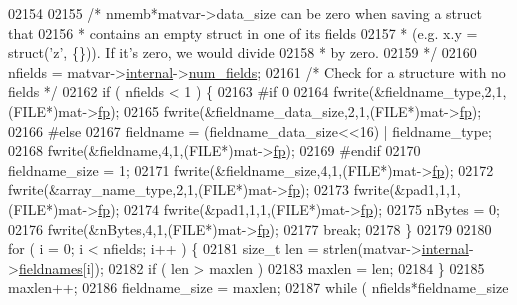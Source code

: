 \begin{DoxyCode}
{{{{{{{{{{{{{{{{02154 
02155             \textcolor{comment}{/* nmemb*matvar->data\_size can be zero when saving a struct that}
02156 \textcolor{comment}{             * contains an empty struct in one of its fields}
02157 \textcolor{comment}{             * (e.g. x.y = struct('z', \{\})). If it's zero, we would divide}
02158 \textcolor{comment}{             * by zero.}
02159 \textcolor{comment}{             */}
02160             nfields = matvar->\hyperlink{group___m_a_t_a6e97e3ed9f40c49322c18561c2a94e92}{internal}->\hyperlink{structmatvar__internal_a93fc447484f455eddf9334f2e9e411c2}{num\_fields};
02161             \textcolor{comment}{/* Check for a structure with no fields */}
02162             if ( nfields < 1 ) \{
02163 \textcolor{preprocessor}{#if 0}
02164                 fwrite(&fieldname\_type,2,1,(FILE*)mat->\hyperlink{struct__mat__t_a85f562e407ca9ad4d2a6e14f839432b7}{fp});
02165                 fwrite(&fieldname\_data\_size,2,1,(FILE*)mat->\hyperlink{struct__mat__t_a85f562e407ca9ad4d2a6e14f839432b7}{fp});
02166 \textcolor{preprocessor}{#else}
02167                 fieldname = (fieldname\_data\_size<<16) | fieldname\_type;
02168                 fwrite(&fieldname,4,1,(FILE*)mat->\hyperlink{struct__mat__t_a85f562e407ca9ad4d2a6e14f839432b7}{fp});
02169 \textcolor{preprocessor}{#endif}
02170                 fieldname\_size = 1;
02171                 fwrite(&fieldname\_size,4,1,(FILE*)mat->\hyperlink{struct__mat__t_a85f562e407ca9ad4d2a6e14f839432b7}{fp});
02172                 fwrite(&array\_name\_type,2,1,(FILE*)mat->\hyperlink{struct__mat__t_a85f562e407ca9ad4d2a6e14f839432b7}{fp});
02173                 fwrite(&pad1,1,1,(FILE*)mat->\hyperlink{struct__mat__t_a85f562e407ca9ad4d2a6e14f839432b7}{fp});
02174                 fwrite(&pad1,1,1,(FILE*)mat->\hyperlink{struct__mat__t_a85f562e407ca9ad4d2a6e14f839432b7}{fp});
02175                 nBytes = 0;
02176                 fwrite(&nBytes,4,1,(FILE*)mat->\hyperlink{struct__mat__t_a85f562e407ca9ad4d2a6e14f839432b7}{fp});
02177                 \textcolor{keywordflow}{break};
02178             \}
02179 
02180             \textcolor{keywordflow}{for} ( i = 0; i < nfields; i++ ) \{
02181                 \textcolor{keywordtype}{size\_t} len = strlen(matvar->\hyperlink{group___m_a_t_a6e97e3ed9f40c49322c18561c2a94e92}{internal}->\hyperlink{structmatvar__internal_a7574d000bfc98ad4860ae6590b8d4985}{fieldnames}[i]);
02182                 \textcolor{keywordflow}{if} ( len > maxlen )
02183                     maxlen = len;
02184             \}
02185             maxlen++;
02186             fieldname\_size = maxlen;
02187             \textcolor{keywordflow}{while} ( nfields*fieldname\_size %
}}}}}}}}}}}}}}}}
\end{DoxyCode}
